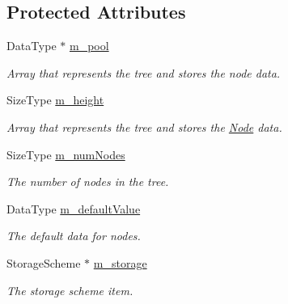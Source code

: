 \subsection*{Protected Attributes}
\begin{DoxyCompactItemize}
\item 
\hypertarget{class_complete_binary_tree_a4d467abffbf4a782a6415b0fd1196399}{
DataType $\ast$ \hyperlink{class_complete_binary_tree_a4d467abffbf4a782a6415b0fd1196399}{m\_\-pool}}
\label{class_complete_binary_tree_a4d467abffbf4a782a6415b0fd1196399}

\begin{DoxyCompactList}\small\item\em Array that represents the tree and stores the node data. \item\end{DoxyCompactList}\item 
SizeType \hyperlink{class_complete_binary_tree_aeedb9377bd834adf4c84cdfc628048da}{m\_\-height}
\begin{DoxyCompactList}\small\item\em Array that represents the tree and stores the \hyperlink{class_complete_binary_tree_1_1_node}{Node} data. \item\end{DoxyCompactList}\item 
\hypertarget{class_complete_binary_tree_afe30a31b80041d0eb0bb5544b638641b}{
SizeType \hyperlink{class_complete_binary_tree_afe30a31b80041d0eb0bb5544b638641b}{m\_\-numNodes}}
\label{class_complete_binary_tree_afe30a31b80041d0eb0bb5544b638641b}

\begin{DoxyCompactList}\small\item\em The number of nodes in the tree. \item\end{DoxyCompactList}\item 
\hypertarget{class_complete_binary_tree_a830424f29bfab1f7ffe064d12b8ed72b}{
DataType \hyperlink{class_complete_binary_tree_a830424f29bfab1f7ffe064d12b8ed72b}{m\_\-defaultValue}}
\label{class_complete_binary_tree_a830424f29bfab1f7ffe064d12b8ed72b}

\begin{DoxyCompactList}\small\item\em The default data for nodes. \item\end{DoxyCompactList}\item 
\hypertarget{class_complete_binary_tree_a68a546f8b34d808eb2efd281a31dac9f}{
StorageScheme $\ast$ \hyperlink{class_complete_binary_tree_a68a546f8b34d808eb2efd281a31dac9f}{m\_\-storage}}
\label{class_complete_binary_tree_a68a546f8b34d808eb2efd281a31dac9f}

\begin{DoxyCompactList}\small\item\em The storage scheme item. \item\end{DoxyCompactList}\end{DoxyCompactItemize}


